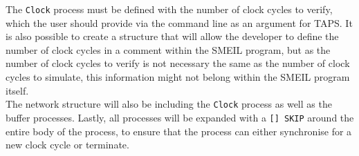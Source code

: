 The \texttt{Clock} process must be defined with the number of clock cycles to verify, which the user should provide via the command line as an argument for TAPS. It is also possible to create a structure that will allow the developer to define the number of clock cycles in a comment within the SMEIL program, but as the number of clock cycles to verify is not necessary the same as the number of clock cycles to simulate, this information might not belong within the SMEIL program itself. \\

The network structure will also be including the \texttt{Clock} process as well as the buffer processes. Lastly, all processes will be expanded with a \texttt{[] SKIP} around the entire body of the process, to ensure that the process can either synchronise for a new clock cycle or terminate.


%
%
%


